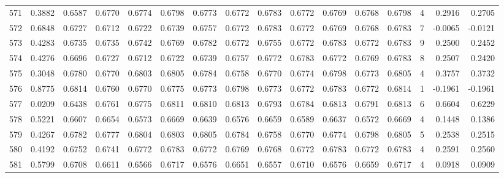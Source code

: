 \begin{tabular}{lrrrrrrrrrrrrrrr}
571 &      0.3882 &  0.6587 &  0.6770 &  0.6774 &  0.6798 &  0.6773 &  0.6772 &  0.6783 &  0.6772 &  0.6769 &   0.6768 &     0.6798 &      4 &                    0.2916 &                     0.2705 \\
572 &      0.6848 &  0.6727 &  0.6712 &  0.6722 &  0.6739 &  0.6757 &  0.6772 &  0.6783 &  0.6772 &  0.6769 &   0.6768 &     0.6783 &      7 &                   -0.0065 &                    -0.0121 \\
573 &      0.4283 &  0.6735 &  0.6735 &  0.6742 &  0.6769 &  0.6782 &  0.6772 &  0.6755 &  0.6772 &  0.6783 &   0.6772 &     0.6783 &      9 &                    0.2500 &                     0.2452 \\
574 &      0.4276 &  0.6696 &  0.6727 &  0.6712 &  0.6722 &  0.6739 &  0.6757 &  0.6772 &  0.6783 &  0.6772 &   0.6769 &     0.6783 &      8 &                    0.2507 &                     0.2420 \\
575 &      0.3048 &  0.6780 &  0.6770 &  0.6803 &  0.6805 &  0.6784 &  0.6758 &  0.6770 &  0.6774 &  0.6798 &   0.6773 &     0.6805 &      4 &                    0.3757 &                     0.3732 \\
576 &      0.8775 &  0.6814 &  0.6760 &  0.6770 &  0.6775 &  0.6773 &  0.6798 &  0.6773 &  0.6772 &  0.6783 &   0.6772 &     0.6814 &      1 &                   -0.1961 &                    -0.1961 \\
577 &      0.0209 &  0.6438 &  0.6761 &  0.6775 &  0.6811 &  0.6810 &  0.6813 &  0.6793 &  0.6784 &  0.6813 &   0.6791 &     0.6813 &      6 &                    0.6604 &                     0.6229 \\
578 &      0.5221 &  0.6607 &  0.6654 &  0.6573 &  0.6669 &  0.6639 &  0.6576 &  0.6659 &  0.6589 &  0.6637 &   0.6572 &     0.6669 &      4 &                    0.1448 &                     0.1386 \\
579 &      0.4267 &  0.6782 &  0.6777 &  0.6804 &  0.6803 &  0.6805 &  0.6784 &  0.6758 &  0.6770 &  0.6774 &   0.6798 &     0.6805 &      5 &                    0.2538 &                     0.2515 \\
580 &      0.4192 &  0.6752 &  0.6741 &  0.6772 &  0.6783 &  0.6772 &  0.6769 &  0.6768 &  0.6772 &  0.6783 &   0.6772 &     0.6783 &      4 &                    0.2591 &                     0.2560 \\
581 &      0.5799 &  0.6708 &  0.6611 &  0.6566 &  0.6717 &  0.6576 &  0.6651 &  0.6557 &  0.6710 &  0.6576 &   0.6659 &     0.6717 &      4 &                    0.0918 &                     0.0909 \\

\end{tabular}
